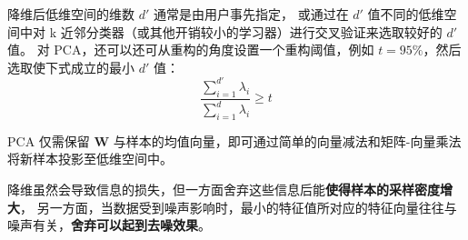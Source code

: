 降维后低维空间的维数 $d'$ 通常是由用户事先指定，
或通过在 $d'$ 值不同的低维空间中对 k 近邻分类器（或其他开销较小的学习器）进行交叉验证来选取较好的 $d'$ 值。
对 PCA，还可以还可从重构的角度设置一个重构阈值，例如 $t = 95\%$，然后选取使下式成立的最小 $d'$ 值：
\begin{equation}
   \dfrac{\sum_{i=1}^{d'} \lambda_i}{\sum_{i=1}^d{\lambda_i}} \geq t 
\end{equation}


PCA 仅需保留 $\mathbf W$ 与样本的均值向量，即可通过简单的向量减法和矩阵-向量乘法将新样本投影至低维空间中。

降维虽然会导致信息的损失，但一方面舍弃这些信息后能\textbf{使得样本的采样密度增大}，
另一方面，当数据受到噪声影响时，最小的特征值所对应的特征向量往往与噪声有关，\textbf{舍弃可以起到去噪效果}。